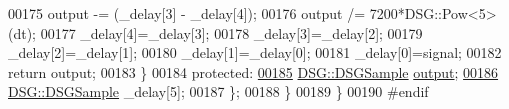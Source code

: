 \begin{DoxyCode}
00175                 output -= (\_delay[3] - \_delay[4]);
00176                 output /= 7200*DSG::Pow<5>(dt);
00177                 \_delay[4]=\_delay[3];
00178                 \_delay[3]=\_delay[2];
00179                 \_delay[2]=\_delay[1];
00180                 \_delay[1]=\_delay[0];
00181                 \_delay[0]=signal;
00182                 \textcolor{keywordflow}{return} output;
00183             \}
00184         \textcolor{keyword}{protected}:
\hypertarget{_d_p_w_8h_source_l00185}{}\hyperlink{class_d_s_g_1_1_d_p_w_1_1_d_p_w___differentiator_3_016_01_4_a6939d53801d66571b5935bcd5561548a}{00185}             \hyperlink{namespace_d_s_g_ac39a94cd27ebcd9c1e7502d0c624894a}{DSG::DSGSample} \hyperlink{class_d_s_g_1_1_d_p_w_1_1_d_p_w___differentiator_3_016_01_4_a6939d53801d66571b5935bcd5561548a}{output};
\hypertarget{_d_p_w_8h_source_l00186}{}\hyperlink{class_d_s_g_1_1_d_p_w_1_1_d_p_w___differentiator_3_016_01_4_a8f3e45aa44791b711f6e71aff92505ca}{00186}             \hyperlink{namespace_d_s_g_ac39a94cd27ebcd9c1e7502d0c624894a}{DSG::DSGSample} \_delay[5];
00187         \};
00188     \}
00189 \}
00190 \textcolor{preprocessor}{#endif}
\end{DoxyCode}
